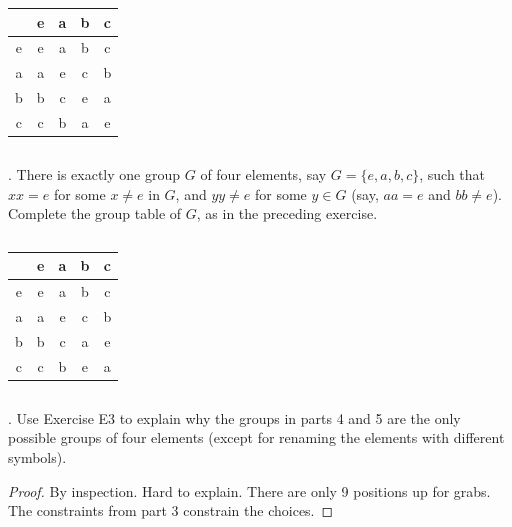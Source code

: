 \documentclass[twoside]{amsart}
\begin{document}
\begin{enumerate}[A.]
\begin{enumerate}[(a)]
      \tiny \begin{verbatim}

      \end{verbatim} \normalsize
      \begin{center}
      \begin{tabular}{c|cccc}
           & e & a & b & c \\ \hline
	 e & e & a & b & c \\
	 a & a & e & c & b \\
	 b & b & c & e & a \\
	 c & c & b & a & e
      \end{tabular}
      \end{center}
      \tiny \begin{verbatim}

      \end{verbatim} \normalsize

      . There is exactly one group $G$ of four elements, say
      $G = \{e,a,b,c\}$, such that $xx=e$ for some $x\ne e$ in $G$, and
      $yy \ne e$ for some $y \in G$ (say, $aa=e$ and $bb\ne e$). Complete
      the group table of $G$, as in the preceding exercise.
      \tiny \begin{verbatim}

      \end{verbatim} \normalsize
      \begin{center}
      \begin{tabular}{c|cccc}
           & e & a & b & c \\ \hline
	 e & e & a & b & c \\
	 a & a & e & c & b \\
	 b & b & c & a & e \\
	 c & c & b & e & a
      \end{tabular}
      \end{center}
      \tiny \begin{verbatim}

      \end{verbatim} \normalsize

      . Use Exercise E3 to explain why the groups in parts 4
      and 5 are the only possible groups of four elements (except for
      renaming the elements with different symbols).

      \begin{proof}
      By inspection. Hard to explain. There are only 9 positions
      up for grabs. The constraints from part 3 constrain the choices.
      \end{proof}


\end{enumerate}
\end{enumerate}
\end{document}
